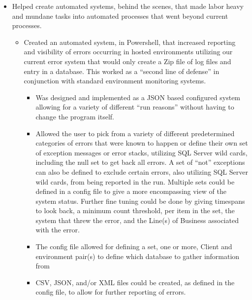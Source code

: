 \documentclass[margin]{res}
\begin{document}
\begin{resume}
\begin{itemize}
\begin{itemize}
         \end{itemize}
      \item Helped create automated systems, behind the scenes, that made labor heavy 
         and mundane tasks into automated processes that went beyond current \\
         processes.
         \begin{itemize}
            \item Created an automated system, in Powershell, that increased reporting 
               and visibility of errors occurring in hosted environments utilizing our 
               current error system that would only create a Zip file of log files and 
               entry in a database. This worked as a ``second line of defense'' in 
               conjunction with standard environment monitoring systems.
               \begin{itemize}
                  \item Was designed and implemented as a JSON based configured system 
                     allowing for a variety of different ``run reasons'' without having 
                     to change the program itself.
                  \item Allowed the user to pick from a variety of different predetermined 
                     categories of errors that were known to happen or define their own set 
                     of exception messages or error stacks, utilizing SQL Server wild cards, 
                     including the null set to get back all errors. A set of ``not'' exceptions 
                     can also be defined to exclude certain errors, also utilizing SQL Server 
                     wild cards, from being reported in the run. 
                     Multiple sets could be defined in a config file to give a more 
                     encompassing view of the system status. 
                     Further fine tuning could be done by giving timespans to look back, a 
                     minimum count threshold, per item in the set, the system that threw 
                     the error, and the Line(s) of Business associated with the error.
                  \item The config file allowed for defining a set, one or more, Client and 
                     environment pair(s) to define which database to gather information from
                  \item CSV, JSON, and/or XML files could be created, as defined in the  
                     config file, to allow for further reporting of errors.

\end{itemize}
\end{itemize}
\end{itemize}
\end{resume}
\end{document}

